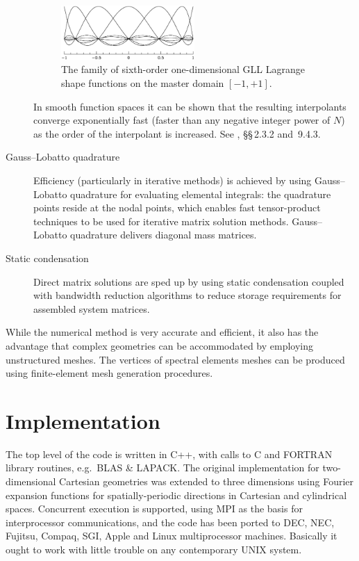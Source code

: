 \documentclass[11pt,a4paper]{report}
\begin{document}
\begin{description}
\begin{figure}
\begin{center}
  \includegraphics[width=0.5\textwidth]{shape7x7.eps}
\end{center}
\caption{The family of sixth-order one-dimensional GLL Lagrange shape
  functions on the master domain $[-1,+1]$.}
\label{fig:shapes}
\end{figure}
In smooth function spaces it can be shown that the resulting
interpolants converge exponentially fast (faster than any negative
integer power of $N$) as the order of the interpolant is increased.
See \citet{chqz88}, \S\S\,2.3.2 and~9.4.3.
\item[Gauss--Lobatto quadrature]
Efficiency (particularly in iterative methods) is achieved by
using Gauss--Lobatto quadrature for evaluating elemental integrals: the
quadrature points reside at the nodal points, which enables fast
tensor-product techniques to be used for iterative matrix solution
methods.  Gauss--Lobatto quadrature delivers diagonal mass matrices.
\item[Static condensation]
Direct matrix solutions are sped up by using static condensation
coupled with bandwidth reduction algorithms to reduce storage
requirements for assembled system matrices.
\end{description}

While the numerical method is very accurate and efficient, it also has
the advantage that complex geometries can be accommodated by employing
unstructured meshes.  The vertices of spectral elements meshes can be
produced using finite-element mesh generation procedures.

\section{Implementation}

The top level of the code is written in C++, with calls to C and
FORTRAN library routines, e.g.\ BLAS \& LAPACK. The original
implementation for two-dimensional Cartesian geometries was extended
to three dimensions using Fourier expansion functions for
spatially-periodic directions in Cartesian and cylindrical spaces.
Concurrent execution is supported, using MPI as the basis for
interprocessor communications, and the code has been ported to DEC,
NEC, Fujitsu, Compaq, SGI, Apple and Linux multiprocessor
machines. Basically it ought to work with little trouble on any
contemporary UNIX system.
\end{document}
